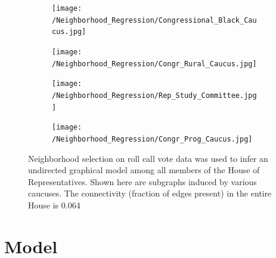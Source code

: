 \documentclass{article}
\begin{document}
\begin{figure}[h]
  \centering
    \begin{subfigure}[b]{0.49\textwidth}
        \texttt{[image: /Neighborhood\_Regression/Congressional\_Black\_Caucus.jpg]}
        \caption{}
    \end{subfigure}
          \begin{subfigure}[b]{0.49\textwidth}
        \texttt{[image: /Neighborhood\_Regression/Congr\_Rural\_Caucus.jpg]}
        \caption{}
    \end{subfigure}
        \begin{subfigure}[b]{0.49\textwidth}
        \texttt{[image: /Neighborhood\_Regression/Rep\_Study\_Committee.jpg]}
        \caption{}
    \end{subfigure}
          \begin{subfigure}[b]{0.49\textwidth}
        \texttt{[image: /Neighborhood\_Regression/Congr\_Prog\_Caucus.jpg]}
        \caption{}
    \end{subfigure}
  \caption{Neighborhood selection on roll call vote data was used to infer an undirected graphical model  among all members of the House of Representatives. Shown here are subgraphs induced by various caucuses. The connectivity (fraction of edges present) in the entire House is 0.064}
      \label{fig:Nhood_Caucus}
\end{figure}


\section{Model}
\label{model}
\end{document}
